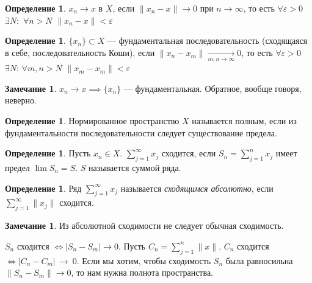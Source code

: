 \documentclass[11pt,openany,a4paper]{scrartcl}
\theoremstyle{plain}
\theoremstyle{definition}
\newtheorem{definition}[theorem]{Определение}
\newtheorem{remark}[theorem]{Замечание}
\newcommand{\underto}[1]{\xrightarrow[#1]{}}
\begin{document}
\begin{definition}
    $x_n \to x$ в $X$, если $\|x_n - x\| \to 0$ при $n \to \infty$, то есть $\forall
    \varepsilon > 0$ $\exists N$:~$\forall n > N$ $\|x_n - x\| < \varepsilon$
\end{definition}

\begin{definition}
    $\{x_n\} \subset X$ — фундаментальная последовательность (сходящаяся в себе,
    последовательность Коши), если $\|x_n - x_m\| \underto{m,n \to \infty} 0$, то есть
    $\forall \varepsilon > 0$ $\exists N$: $\forall m,n > N$ $\|x_m - x_m\| < \varepsilon$
\end{definition}

\begin{remark}
    $x_n \to x \implies \{x_n\}$ — фундаментальная. Обратное, вообще говоря, неверно.
\end{remark}
\begin{definition}
    Нормированное пространство $X$ называется полным, если из фундаментальности
    последовательности следует существование предела.
\end{definition}

\begin{definition}
    Пусть $x_n \in X$. $\sum\limits_{j = 1}^\infty x_j$ сходится, если
    $S_n = \sum\limits_{j = 1}^n x_j$ имеет предел $\lim S_n = S$. $S$ называется
    суммой ряда.
\end{definition}

\begin{definition}
    Ряд $\sum\limits_{j = 1}^\infty x_j$ называется \emph{сходящимся абсолютно},
    если $\sum\limits_{j = 1}^\infty \|x_j\|$ сходится.
\end{definition}
\begin{remark}
    Из абсолютной сходимости не следует обычная сходимость.
\end{remark}

$S_n$ сходится $\iff |S_n - S_m| \to 0$. Пусть $C_n = \sum\limits_{j = 1}^n \|x\|$.
$C_n$ сходится $\iff |C_n - C_m|~\to~0$.
Если мы хотим, чтобы сходимость $S_n$ была равносильна
$\|S_n - S_m\| \to 0$, то нам нужна полнота пространства.
\end{document}

